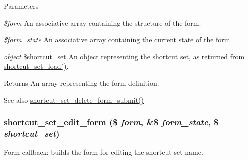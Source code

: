 \begin{DoxyParams}{Parameters}
\item[{\em \$form}]An associative array containing the structure of the form. \item[{\em \$form\_\-state}]An associative array containing the current state of the form. \item[{\em object}]\$shortcut\_\-set An object representing the shortcut set, as returned from \hyperlink{shortcut_8module_a66161b6ac12978c1a31bb5c5bf27dc65}{shortcut\_\-set\_\-load()}.\end{DoxyParams}
\begin{DoxyReturn}{Returns}
An array representing the form definition.
\end{DoxyReturn}
\begin{DoxySeeAlso}{See also}
\hyperlink{shortcut_8admin_8inc_a69d83199a5d74235bb0f46deb5cc0d5b}{shortcut\_\-set\_\-delete\_\-form\_\-submit()} 
\end{DoxySeeAlso}
\hypertarget{group__forms_gaaa9ef77c9928065c19fd0177ecb611b1}{
\subsubsection[{shortcut\_\-set\_\-edit\_\-form}]{\setlength{\rightskip}{0pt plus 5cm}shortcut\_\-set\_\-edit\_\-form (\$ {\em form}, \/  \&\$ {\em form\_\-state}, \/  \$ {\em shortcut\_\-set})}}
\label{group__forms_gaaa9ef77c9928065c19fd0177ecb611b1}
Form callback: builds the form for editing the shortcut set name.


